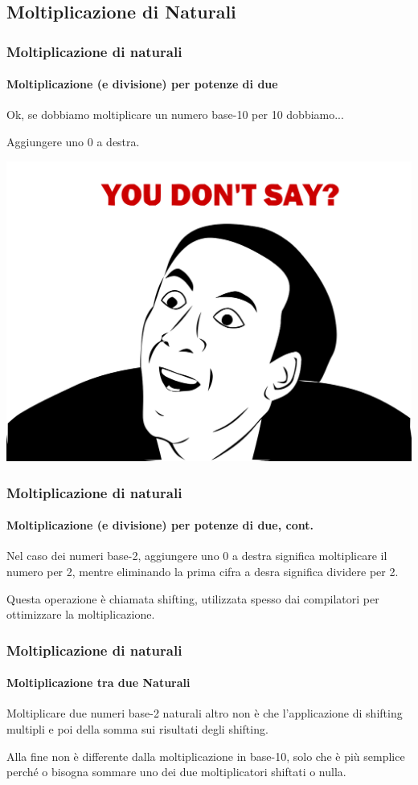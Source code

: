 \documentclass{beamer}
\begin{document}
	\subsection[NatMul]{Moltiplicazione di Naturali}  
	  \begin{frame}
	    \frametitle{Moltiplicazione di naturali}
	    \framesubtitle{Moltiplicazione (e divisione) per potenze di due}
	    Ok, se dobbiamo moltiplicare un numero base-10 per 10 dobbiamo...
	    
	    \pause
	    
	    \begin{center}
		    Aggiungere uno 0 a destra.
		    
		    \includegraphics[width=.5\textwidth]{IMGs/youdontsay.png}
	    \end{center}
	    
	  \end{frame}
	  \begin{frame}
	    \frametitle{Moltiplicazione di naturali}
	    \framesubtitle{Moltiplicazione (e divisione) per potenze di due, cont.}
	    Nel caso dei numeri base-2, aggiungere uno 0 a destra significa
	    moltiplicare il numero per 2, mentre eliminando la prima cifra a
	    desra significa dividere per 2.
	    
	    \vspace{2em}
	    
	    Questa operazione è chiamata shifting, utilizzata spesso dai compilatori
	    per ottimizzare la moltiplicazione.
	  \end{frame}
	  \begin{frame}
	    \frametitle{Moltiplicazione di naturali}
	    \framesubtitle{Moltiplicazione tra due Naturali}
	    Moltiplicare due numeri base-2 naturali altro non è che l'applicazione
	    di shifting multipli e poi della somma sui risultati degli shifting.
	    
	    \vspace{2em}
	    
	    Alla fine non è differente dalla moltiplicazione in base-10, solo che è più
	    semplice perché o bisogna sommare uno dei due moltiplicatori shiftati o nulla.
	  \end{frame}
\end{document}

